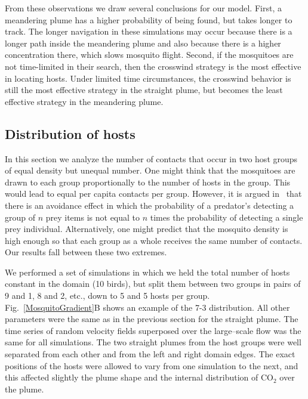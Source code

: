 \documentclass[10pt]{article}
\begin{document}
				From these observations we draw several conclusions for our model.  First, a meandering plume has a higher probability of being found, but takes longer to track. The longer navigation in these simulations may occur because there is a longer path inside the meandering plume and also because there is a higher concentration there, which slows mosquito flight. Second, if the mosquitoes are not time-limited in their search, then the crosswind strategy is the most effective in locating hosts. Under limited time circumstances, the crosswind behavior is still the most effective strategy in the straight plume, but becomes the least effective strategy in the meandering plume.
	
	
\subsection*{Distribution of hosts}\label{sec:hostdist}
In this section we analyze the number of contacts that occur in two host groups of equal density but unequal number. One might think that the mosquitoes are drawn to each group proportionally to the number of hosts in the group. This would lead to equal per capita contacts per group.  However, it is argued in~\cite{Turner1986} that there is an avoidance effect in which the probability of a predator's detecting a group of $n$ prey items is not equal to $n$ times the probability of detecting a single prey individual. 
Alternatively, one might predict that the mosquito density is high enough so that each group as a whole receives the same number of contacts. Our results fall between these two extremes.

We performed a set of simulations in which we held the total number of hosts constant in the domain (10 birds), but split them between two groups in pairs of 9 and 1, 8 and 2, etc., down to 5 and 5 hosts per group.  Fig.~\ref{MosquitoGradient}B shows an example of the 7-3 distribution.
All other parameters were the same as in the previous section for the straight plume.
The time series of random velocity fields superposed over the large--scale flow was the same for all simulations. The two straight plumes from the host groups were well separated from each other and from the left and right domain edges. The exact positions of the hosts were allowed to vary from one simulation to the next, and this affected slightly the plume shape and the internal distribution of CO$_2$ over the plume.
\end{document}
